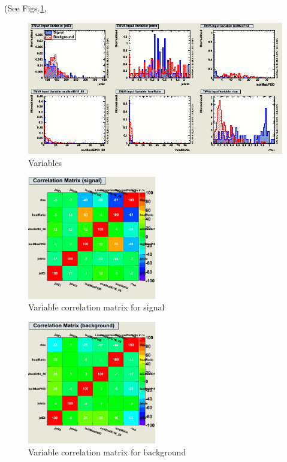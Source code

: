 (See Figs.\ref{fig:variables_c1},
 
\begin{figure}[h]
\begin{center}
\includegraphics[width=1.0\textwidth]{images/ahVariables_c1.png}
\caption{Variables}
\label{fig:variables_c1}
\end{center}
\end{figure}

\begin{figure}[h]
\begin{center}
\includegraphics[width=0.5\textwidth]{images/ahCorrelationMatrixS.png}
\caption{Variable correlation matrix for signal}
\label{fig:ahCorrelationMatrixS}
\end{center}
\end{figure}

\begin{figure}[h]
\begin{center}
\includegraphics[width=0.5\textwidth]{images/ahCorrelationMatrixB.png}
\caption{Variable correlation matrix for background}
\label{fig:ahCorrelationMatrixB}
\end{center}
\end{figure}

